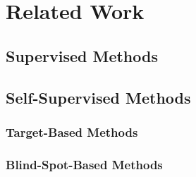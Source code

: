 \chapter{Related Work}\label{ch:related-work}


\section{Supervised Methods}

\section{Self-Supervised Methods}

\subsection{Target-Based Methods}

\subsection{Blind-Spot-Based Methods}
